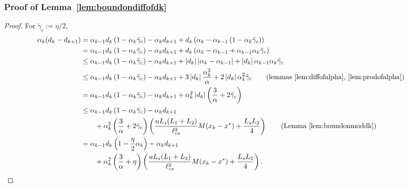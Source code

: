 \documentclass{article}
\newcommand{\lrp}[1]{\left( #1 \right)}
\newcommand{\abs}[1]{\left|{#1}\right|}
\newcommand{\lcs}{\ell_{cs}}
\begin{document}
\subsubsection{Proof of Lemma~\ref{lem:boundondiffofdk}}\label{app:proof_lem:boundondiffofdk}
\begin{proof} For $\tilde{\gamma}_c := \eta/2$,
    \begin{align*}
        \alpha_k(d_k - d_{k+1}) &= \alpha_{k-1} d_k \lrp{1 - \alpha_k\tilde{\gamma}_c} - \alpha_k d_{k+1} + 
        d_k \lrp{\alpha_k - \alpha_{k-1}\lrp{1 - \alpha_k \tilde{\gamma}_c}}\\
        &= \alpha_{k-1} d_k \lrp{1 - \alpha_k\tilde{\gamma}_c} - \alpha_k d_{k+1} + 
        d_k \lrp{\alpha_k - \alpha_{k-1} +  \alpha_{k-1}\alpha_k \tilde{\gamma}_c}\\
        &\le \alpha_{k-1} d_k \lrp{1 - \alpha_k\tilde{\gamma}_c} - \alpha_k d_{k+1} + 
        \abs{d_k}\abs{\alpha_k - \alpha_{k-1}} + \abs{d_k}  \alpha_{k-1}\alpha_k \tilde{\gamma}_c\\
        &\le \alpha_{k-1} d_k \lrp{1 - \alpha_k\tilde{\gamma}_c} - \alpha_k d_{k+1} + 
        3\abs{d_k}\frac{\alpha^2_k}{\alpha} + 2\abs{d_k}  \alpha^2_k \tilde{\gamma}_c \tag{lemmas~\ref{lem:diffofalpha},~\ref{lem:prodofalpha}}\\
        &= \alpha_{k-1} d_k \lrp{1 - \alpha_k\tilde{\gamma}_c} - \alpha_k d_{k+1} + \alpha^2_k \abs{d_k}\lrp{\frac{3}{\alpha} + 2 \tilde{\gamma}_c}\\
        &\le \alpha_{k-1} d_k \lrp{1 - \alpha_k\tilde{\gamma}_c} - \alpha_k d_{k+1} \\
        &\qquad +  \alpha^2_k \lrp{\frac{3}{\alpha} + 2 \tilde{\gamma}_c}\lrp{\frac{uL_s(L_1+L_2)}{\lcs^2} M(x_k-x^*) + \frac{L_sL_2}{4}} \tag{Lemma~\ref{lem:boundonmoddk}}\\
        &= \alpha_{k-1} d_k \lrp{1 - \frac{\eta}{2}\alpha_k} - \alpha_k d_{k+1} \\
        &\qquad +  \alpha^2_k \lrp{\frac{3}{\alpha} + \eta}\lrp{\frac{uL_s(L_1+L_2)}{\lcs^2} M(x_k-x^*) + \frac{L_sL_2}{4}}. 
    \end{align*}
\end{proof}
\end{document}
